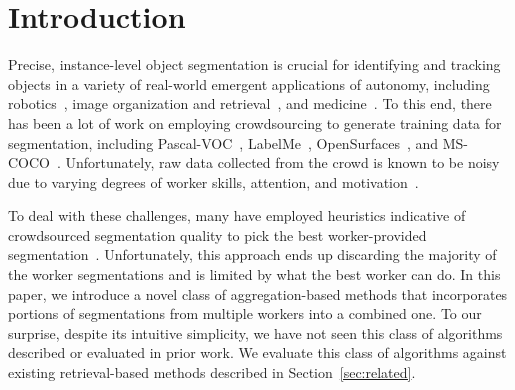 \vspace{-10pt}
\section{Introduction\label{sec:intro}}
Precise, instance-level object segmentation is crucial for identifying and tracking objects in a variety of real-world emergent applications of autonomy, including robotics~\cite{Natonek1998}, image organization and retrieval~\cite{Yamaguchi2012}, and medicine~\cite{Irshad2014}. To this end, there has been a lot of work on employing crowdsourcing to generate training data for segmentation, including Pascal-VOC~\cite{Everingham15}, LabelMe~\cite{Torralba2010}, OpenSurfaces~\cite{bell15minc}, and MS-COCO~\cite{Lin2012}. Unfortunately, raw data collected from the crowd is known to be noisy due to varying degrees of worker skills, attention, and motivation~\cite{bell14intrinsic,MDWWelinder2010}. 
\par To deal with these challenges, many have employed heuristics indicative of crowdsourced segmentation quality to pick the best worker-provided segmentation~\cite{Sorokin2008,Vittayakorn2011}. Unfortunately, this approach ends up discarding the majority of the worker segmentations and is limited by what the best worker can do. In this paper, we introduce a novel class of aggregation-based methods that incorporates portions of segmentations from multiple workers into a combined one. To our surprise, despite its intuitive simplicity, we have not seen this class of algorithms described or evaluated in prior work. We evaluate this class of algorithms against existing retrieval-based methods described in Section~\ref{sec:related}. %
